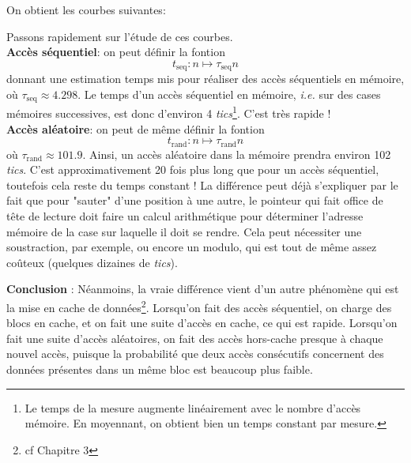 \documentclass[11pt, a4 paper]{article}
\begin{document}
On obtient les courbes suivantes:
\begin{center}
\end{center}
Passons rapidement sur l'étude de ces courbes.\\
\textbf{Accès séquentiel}: on peut définir la fontion
\begin{equation*}
    t_{\text{seq}} \colon n \mapsto \tau_\text{seq} n
\end{equation*}
donnant une estimation temps mis pour réaliser des accès séquentiels en mémoire, où $\tau_\text{seq} \approx 4.298$. Le temps d'un accès séquentiel en mémoire, \textit{i.e.} sur des cases mémoires successives, est donc d'environ 4 \textit{tics}\footnote{Le temps de la mesure augmente linéairement avec le nombre d'accès mémoire. En moyennant, on obtient bien un temps constant par mesure.}. C'est très rapide !\\

\noindent
\textbf{Accès aléatoire}: on peut de même définir la fontion
\begin{equation*}
    t_{\text{rand}} \colon n \mapsto \tau_\text{rand} n
\end{equation*}
où $\tau_\text{rand} \approx 101.9$. Ainsi, un accès aléatoire dans la mémoire prendra environ 102 \textit{tics}. C'est approximativement 20 fois plus long que pour un accès séquentiel, toutefois cela reste du temps constant ! La différence peut déjà s'expliquer par le fait que pour "sauter" d'une position à une autre, le pointeur qui fait office de tête de lecture doit faire un calcul arithmétique pour déterminer l'adresse mémoire de la case sur laquelle il doit se rendre. Cela peut nécessiter une soustraction, par exemple, ou encore un modulo, qui est tout de même assez coûteux (quelques dizaines de \textit{tics}).

\begin{framed}
    \textbf{Conclusion} :
    Néanmoins, la vraie différence vient d'un autre phénomène qui est la mise en cache de données\footnote{cf Chapitre 3}. Lorsqu'on fait des accès séquentiel, on charge des blocs en cache, et on fait une suite d'accès en cache, ce qui est rapide. Lorsqu'on fait une suite d'accès aléatoires, on fait des accès hors-cache presque à chaque nouvel accès, puisque la probabilité que deux accès consécutifs concernent des données présentes dans un même bloc est beaucoup plus faible.
\end{framed}
\end{document}
